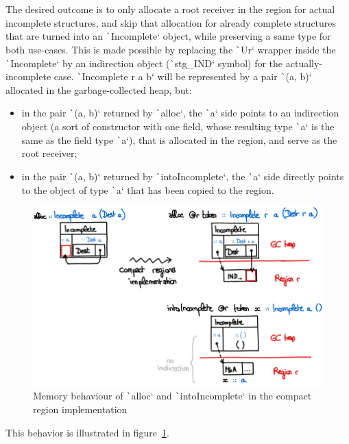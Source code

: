 \documentclass[english]{jflart}
\begin{document}
The desired outcome is to only allocate a root receiver in the region for actual incomplete structures, and skip that allocation for already complete structures that are turned into an \texttt`Incomplete` object, while preserving a same type for both use-cases. This is made possible by replacing the \texttt`Ur` wrapper inside the \texttt`Incomplete` by an 
indirection object (\texttt`stg_IND` symbol) for the actually-incomplete case. \texttt`Incomplete r a b` will be represented by a pair \texttt`(a, b)` allocated in the garbage-collected heap, but:
\begin{itemize}
  \item in the pair \texttt`(a, b)` returned by \texttt`alloc`, the \texttt`a` side points to an indirection object (a sort of constructor with one field, whose resulting type \texttt`a` is the same as the field type \texttt`a`), that is allocated in the region, and serve as the root receiver;
  \item in the pair \texttt`(a, b)` returned by \texttt`intoIncomplete`, the \texttt`a` side directly points to the object of type \texttt`a` that has been copied to the region.
\end{itemize}

\begin{figure}[t]\centering
  \includegraphics[width=12cm]{alloc-region.png}
  \caption{Memory behaviour of \texttt`alloc` and \texttt`intoIncomplete` in the compact region implementation}
  \label{fig:schema-alloc-region}
\end{figure}

This behavior is illustrated in figure~\ref{fig:schema-alloc-region}.
\end{document}
